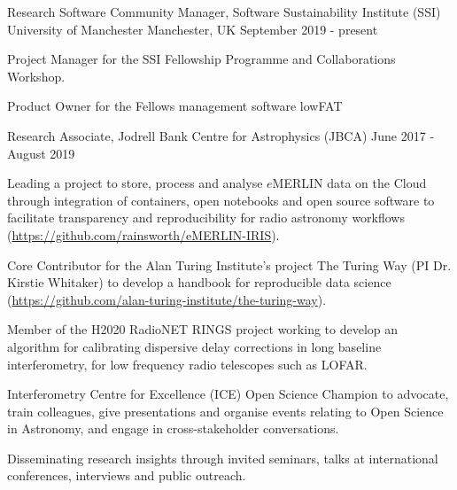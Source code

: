 \vspace{-6pt}
\begin{cventries}
  \cventry
    {Research Software Community Manager, Software Sustainability Institute (SSI)}
    {University of Manchester}
    {Manchester, UK}
    {September 2019 - present}
    {
      \begin{cvitems}
        \item {Project Manager for the SSI Fellowship Programme and Collaborations Workshop.}
        \item{Product Owner for the Fellows management software lowFAT}
      \end{cvitems}
    }\vspace{-15pt}

  \cventry
    {Research Associate, Jodrell Bank Centre for Astrophysics (JBCA)}
    {}
    {}
    {June 2017 - August 2019}
    {
      \begin{cvitems}
        \item {Leading a project to store, process and analyse $e$MERLIN data on the Cloud through integration of containers, open notebooks and open source software to facilitate transparency and reproducibility for radio astronomy workflows (\url{https://github.com/rainsworth/eMERLIN-IRIS}).}
        \item {Core Contributor for the Alan Turing Institute's project The Turing Way (PI Dr. Kirstie Whitaker) to develop a handbook for reproducible data science (\url{https://github.com/alan-turing-institute/the-turing-way}).}
        \item {Member of the H2020 RadioNET RINGS project working to develop an algorithm for calibrating dispersive delay corrections in long baseline interferometry, for low frequency radio telescopes such as LOFAR.}
        \item {Interferometry Centre for Excellence (ICE) Open Science Champion to advocate, train colleagues, give presentations and organise events relating to Open Science in Astronomy, and engage in cross-stakeholder conversations.}
        \item {Disseminating research insights through invited seminars, talks at international conferences, interviews and public outreach.}
      \end{cvitems}
    }\vspace{-6pt}


\end{cventries}
